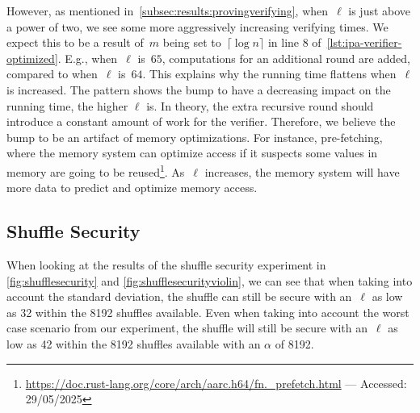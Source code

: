 However, as mentioned in~\autoref{subsec:results:provingverifying}, when~$\ell$ is just above a power of two, we see some more aggressively increasing verifying times.
We expect this to be a result of~$m$ being set to~$\lceil\log n\rceil$ in line 8 of~\autoref{lst:ipa-verifier-optimized}.
E.g., when~$\ell$ is~$65$, computations for an additional round are added, compared to when~$\ell$ is~$64$.
This explains why the running time flattens when~$\ell$ is increased.
The pattern shows the bump to have a decreasing impact on the running time, the higher $\ell$ is.
In theory, the extra recursive round should introduce a constant amount of work for the verifier.
Therefore, we believe the bump to be an artifact of memory optimizations.
For instance, pre-fetching, where the memory system can optimize access if it suspects some values in memory are going to be reused\footnote{\href{https://doc.rust-lang.org/core/arch/aarch64/fn._prefetch.html}{https://doc.rust-lang.org/core/arch/aarc.h64/fn.\_prefetch.html} — Accessed: 29/05/2025}.
As~$\ell$ increases, the memory system will have more data to predict and optimize memory access.

\subsection{Shuffle Security}\label{subsec:Discution-Shuffle-security}
When looking at the results of the shuffle security experiment in \autoref{fig:shufflesecurity} and \autoref{fig:shufflesecurityviolin}, we can see that when taking into account the standard deviation, the shuffle can still be secure with an~$\ell$ as low as 32 within the 8192 shuffles available.
Even when taking into account the worst case scenario from our experiment, the shuffle will still be secure with an~$\ell$ as low as 42 within the 8192 shuffles available with an $\alpha$ of 8192.

